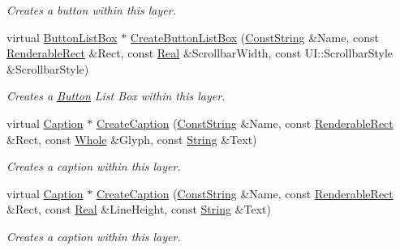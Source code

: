 \begin{DoxyCompactItemize}
\begin{DoxyCompactList}\small\item\em Creates a button within this layer. \item\end{DoxyCompactList}\item 
virtual \hyperlink{classphys_1_1UI_1_1ButtonListBox}{ButtonListBox} $\ast$ \hyperlink{classphys_1_1UI_1_1Layer_a27df96a5487380afae0b665242da061a}{CreateButtonListBox} (\hyperlink{namespacephys_a5ce5049f8b4bf88d6413c47b504ebb31}{ConstString} \&Name, const \hyperlink{structphys_1_1UI_1_1RenderableRect}{RenderableRect} \&Rect, const \hyperlink{namespacephys_af7eb897198d265b8e868f45240230d5f}{Real} \&ScrollbarWidth, const UI::ScrollbarStyle \&ScrollbarStyle)
\begin{DoxyCompactList}\small\item\em Creates a \hyperlink{classphys_1_1UI_1_1Button}{Button} List Box within this layer. \item\end{DoxyCompactList}\item 
virtual \hyperlink{classphys_1_1UI_1_1Caption}{Caption} $\ast$ \hyperlink{classphys_1_1UI_1_1Layer_a6722d243df34dbcf0337292b5bdb9cab}{CreateCaption} (\hyperlink{namespacephys_a5ce5049f8b4bf88d6413c47b504ebb31}{ConstString} \&Name, const \hyperlink{structphys_1_1UI_1_1RenderableRect}{RenderableRect} \&Rect, const \hyperlink{namespacephys_a460f6bc24c8dd347b05e0366ae34f34a}{Whole} \&Glyph, const \hyperlink{namespacephys_aa03900411993de7fbfec4789bc1d392e}{String} \&Text)
\begin{DoxyCompactList}\small\item\em Creates a caption within this layer. \item\end{DoxyCompactList}\item 
virtual \hyperlink{classphys_1_1UI_1_1Caption}{Caption} $\ast$ \hyperlink{classphys_1_1UI_1_1Layer_a82d231a873ea03ad80e70072800eecd4}{CreateCaption} (\hyperlink{namespacephys_a5ce5049f8b4bf88d6413c47b504ebb31}{ConstString} \&Name, const \hyperlink{structphys_1_1UI_1_1RenderableRect}{RenderableRect} \&Rect, const \hyperlink{namespacephys_af7eb897198d265b8e868f45240230d5f}{Real} \&LineHeight, const \hyperlink{namespacephys_aa03900411993de7fbfec4789bc1d392e}{String} \&Text)
\begin{DoxyCompactList}\small\item\em Creates a caption within this layer. \item\end{DoxyCompactList}\item 

\end{DoxyCompactItemize}
